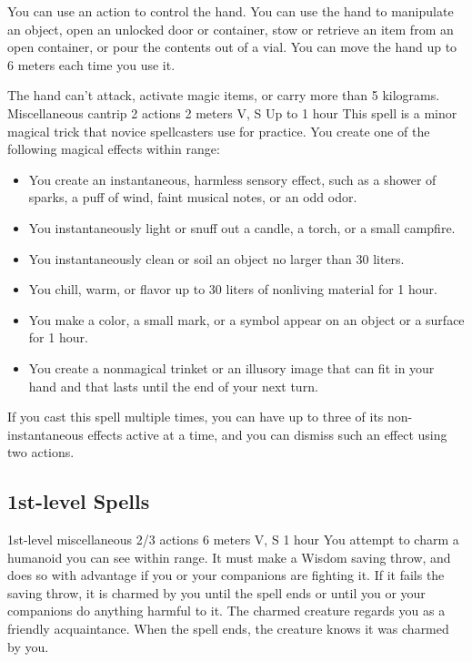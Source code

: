         You can use an action to control the hand.
        You can use the hand to manipulate an object, open an unlocked door or container, stow or retrieve an item from an open container, or pour the contents out of a vial.
        You can move the hand up to 6 meters each time you use it.

        The hand can't attack, activate magic items, or carry more than 5 kilograms.
        {Miscellaneous cantrip}
        {2 actions}
        {2 meters}
        {V, S}
        {Up to 1 hour}
        This spell is a minor magical trick that novice spellcasters use for practice.
        You create one of the following magical effects within range:
        \begin{itemize}
            \item You create an instantaneous, harmless sensory effect, such as a shower of sparks, a puff of wind, faint musical notes, or an odd odor.
            \item You instantaneously light or snuff out a candle, a torch, or a small campfire.
            \item You instantaneously clean or soil an object no larger than 30 liters.
            \item You chill, warm, or flavor up to 30 liters of nonliving material for 1 hour.
            \item You make a color, a small mark, or a symbol appear on an object or a surface for 1 hour.
            \item You create a nonmagical trinket or an illusory image that can fit in your hand and that lasts until the end of your next turn.
        \end{itemize}
        If you cast this spell multiple times, you can have up to three of its non-instantaneous effects active at a time, and you can dismiss such an effect using two actions.
\subsection*{1st-level Spells}
        {1st-level miscellaneous}
        {2/3 actions}
        {6 meters}
        {V, S}
        {1 hour}
        You attempt to charm a humanoid you can see within range.
        It must make a Wisdom saving throw, and does so with advantage if you or your companions are fighting it.
        If it fails the saving throw, it is charmed by you until the spell ends or until you or your companions do anything harmful to it.
        The charmed creature regards you as a friendly acquaintance.
        When the spell ends, the creature knows it was charmed by you.


